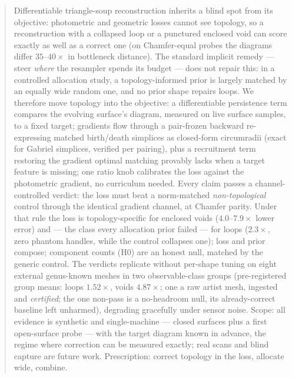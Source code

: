 \documentclass[10pt,twocolumn,letterpaper]{article}
\begin{document}
\begin{abstract}
Differentiable triangle-soup reconstruction inherits a blind spot from its
objective: photometric and geometric losses cannot see topology, so a
reconstruction with a collapsed loop or a punctured enclosed void can
score exactly as well as a correct one (on Chamfer-equal probes the
diagrams differ $35$--$40\times$ in bottleneck distance).
The standard implicit remedy --- steer \emph{where} the resampler
spends its budget --- does not repair this: in a controlled allocation
study, a topology-informed prior is largely matched by an equally wide
random one, and no prior shape repairs loops.
We therefore move topology into the objective: a differentiable
persistence term compares the evolving surface's diagram, measured on
live surface samples, to a fixed target; gradients flow through a
pair-frozen backward re-expressing matched birth/death simplices as
closed-form circumradii (exact for Gabriel simplices, verified per
pairing), plus a recruitment term restoring the gradient optimal
matching provably lacks when a target feature is missing; one ratio
knob calibrates the loss against the photometric gradient, no
curriculum needed.
Every claim passes a channel-controlled verdict: the loss must beat a
norm-matched \emph{non-topological} control through the identical
gradient channel, at Chamfer parity. Under that rule the loss is
topology-specific for enclosed voids ($4.0$--$7.9\times$ lower error) and
--- the class every allocation prior failed --- for loops ($2.3\times$,
zero phantom handles, while the control collapses one); loss and prior
compose; component counts (H0) are an honest null, matched by the
generic control. The verdicts replicate without per-shape tuning on eight external
genus-known meshes in two observable-class groups (pre-registered group
means: loops $1.52\times$, voids $4.87\times$; one a raw artist mesh,
ingested and \emph{certified}; the one non-pass is a no-headroom null,
its already-correct baseline left unharmed), degrading gracefully under
sensor noise.
Scope: all evidence is synthetic and single-machine --- closed surfaces
plus a first open-surface probe --- with the target diagram known in
advance, the regime where correction can be measured exactly; real
scans and blind capture are future work.
Prescription: correct topology in the loss, allocate wide, combine.
\end{abstract}
\end{document}
